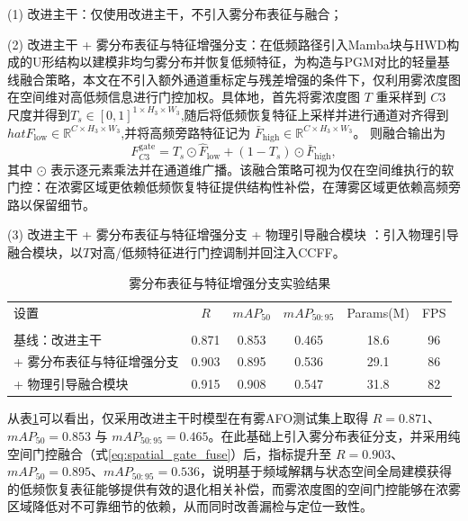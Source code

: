 (1) {改进主干}：仅使用改进主干，不引入雾分布表征与融合；

(2) {改进主干 + 雾分布表征与特征增强分支}：在低频路径引入Mamba块与HWD构成的U形结构以建模非均匀雾分布并恢复低频特征，为构造与PGM对比的轻量基线融合策略，本文在不引入额外通道重标定与残差增强的条件下，仅利用雾浓度图在空间维对高低频信息进行门控加权。具体地，首先将雾浓度图 $T$ 重采样到 $C3$ 尺度并得到$T_s\in[0,1]^{1\times H_3\times W_3}$,随后将低频恢复特征上采样并进行通道对齐得到$hat{F}_{\mathrm{low}}\in\mathbb{R}^{C\times H_3\times W_3}$,并将高频旁路特征记为 $\bar{F}_{\mathrm{high}}\in\mathbb{R}^{C\times H_3\times W_3}$。
则融合输出为
\begin{equation}
F_{C3}^{\mathrm{gate}} = T_s\odot \hat{F}_{\mathrm{low}} + (1-T_s)\odot \bar{F}_{\mathrm{high}},
\label{eq:spatial_gate_fuse}
\end{equation}
其中 $\odot$ 表示逐元素乘法并在通道维广播。该融合策略可视为仅在空间维执行的软门控：在浓雾区域更依赖低频恢复特征提供结构性补偿，在薄雾区域更依赖高频旁路以保留细节。

(3) {改进主干 + 雾分布表征与特征增强分支 + 物理引导融合模块 }：引入物理引导融合模块，以$T$对高/低频特征进行门控调制并回注入CCFF。

\begin{table}[!htbp]
\centering
\caption{雾分布表征与特征增强分支实验结果}
\label{tab:ablation_fog_pgm}
\begin{tabular}{l c c c c c}
\hline
设置 & $R$ & $mAP_{50}$ & $mAP_{50:95}$ & Params(M) & FPS \\\\
\hline
基线：改进主干 & 0.871 & 0.853 & 0.465 & 18.6 & 96 \\
+ 雾分布表征与特征增强分支 & 0.903 & 0.895 & 0.536 & 29.1 & 86 \\
+ 物理引导融合模块 & 0.915 & 0.908 & 0.547 & 31.8 & 82 \\
\hline
\end{tabular}
\vspace{1mm}
\footnotesize
\end{table}

从表\ref{tab:ablation_fog_pgm}可以看出，仅采用改进主干时模型在有雾AFO测试集上取得 $R=0.871$、$mAP_{50}=0.853$ 与 $mAP_{50:95}=0.465$。在此基础上引入雾分布表征分支，并采用纯空间门控融合（式\eqref{eq:spatial_gate_fuse}）后，指标提升至 $R=0.903$、$mAP_{50}=0.895$、$mAP_{50:95}=0.536$，说明基于频域解耦与状态空间全局建模获得的低频恢复表征能够提供有效的退化相关补偿，而雾浓度图的空间门控能够在浓雾区域降低对不可靠细节的依赖，从而同时改善漏检与定位一致性。

